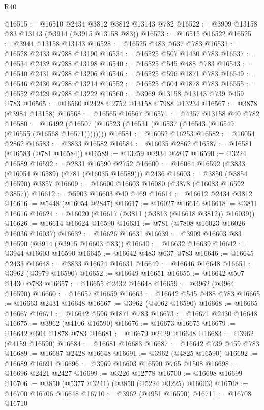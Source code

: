 \begin{lexlean}{R40}
\begin{coremodule}
@16515 := @16510 @2434 @3812 @3812 @13143 @782
@16522 := @3909 @13158 @83 @13143 (@3914 (@3915 @13158 @83))
@16523 := @16515 @16522
@16525 := @3944 @13158 @13143
@16528 := @16525 @483 @637 @783
@16531 := @16528 @2433 @7988 @13190
@16534 := @16525 @507 @1430 @783
@16537 := @16534 @2432 @7988 @13198
@16540 := @16525 @545 @488 @783
@16543 := @16540 @2431 @7988 @13206
@16546 := @16525 @596 @1871 @783
@16549 := @16546 @2430 @7988 @13214
@16552 := @16525 @604 @1878 @783
@16555 := @16552 @2429 @7988 @13222
@16560 := @3969 @13158 @13143 @739 @459 @783
@16565 := @16560 @2428 @2752 @13158 @7988 @13234
@16567 := @3878 (@3984 @13158)
@16568 := @16565 @16567
@16571 := @4357 @13158 @40 @782
@16580 := @16492 (@16507 (@16523 (@16531 (@16537 (@16543 (@16549 (@16555 (@16568 @16571))))))))
@16581 := @16052 @16253
@16582 := @16054 @2862
@16583 := @3833 @16582
@16584 := @16035 @2862
@16587 := @16581 (@16583 (@781 @16584))
@16589 := @13259 @2934 @2847
@16590 := @3224 @16589
@16592 := @2831 @16590 @2752
@16600 := @16064 @16592 (@3833 (@16054 @16589) (@781 (@16035 @16589))) @2436
@16603 := @3850 (@3854 @16590) @3857
@16609 := @16600 @16603 @16080 (@3878 (@16083 @16592 @3857))
@16612 := @5903 @16603 @40 @469
@16614 := @16612 @2434 @3812
@16616 := @5448 (@16054 @2847)
@16617 := @16027 @16616
@16618 := @3811 @16616
@16624 := @16020 (@16617 (@3811 (@3813 (@16618 @3812)) @16039))
@16626 := @16614 @16624 @16590
@16631 := @781 (@7808 @16023 @16026 @16036 @16037)
@16632 := @16626 @16631
@16639 := @3909 @16603 @83 @16590 (@3914 (@3915 @16603 @83))
@16640 := @16632 @16639
@16642 := @3944 @16603 @16590
@16645 := @16642 @483 @637 @783
@16646 := @16645 @2433
@16648 := @3833 @16624 @16631
@16649 := @16646 @16648
@16651 := @3962 (@3979 @16590)
@16652 := @16649 @16651
@16655 := @16642 @507 @1430 @783
@16657 := @16655 @2432 @16648
@16659 := @3962 (@3964 @16590)
@16660 := @16657 @16659
@16663 := @16642 @545 @488 @783
@16665 := @16663 @2431 @16648
@16667 := @3962 (@4062 @16590)
@16668 := @16665 @16667
@16671 := @16642 @596 @1871 @783
@16673 := @16671 @2430 @16648
@16675 := @3962 (@4106 @16590)
@16676 := @16673 @16675
@16679 := @16642 @604 @1878 @783
@16681 := @16679 @2429 @16648
@16683 := @3962 (@4159 @16590)
@16684 := @16681 @16683
@16687 := @16642 @739 @459 @783
@16689 := @16687 @2428 @16648
@16691 := @3962 (@4825 @16590)
@16692 := @16689 @16691
@16696 := @3969 @16603 @16590 @765 @1508
@16698 := @16696 @2421 @2427
@16699 := @3226 @12778
@16700 := @16698 @16699
@16706 := @3850 (@5377 @3241) (@3850 (@5224 @3225) @16603)
@16708 := @16700 @16706 @16648
@16710 := @3962 (@4951 @16590)
@16711 := @16708 @16710

\end{coremodule}
\end{lexlean}
